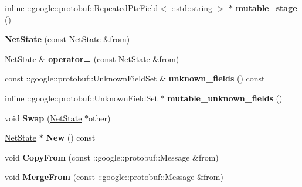 \begin{DoxyCompactItemize}
inline \+::google\+::protobuf\+::\+Repeated\+Ptr\+Field$<$ \+::std\+::string $>$ $\ast$ {\bfseries mutable\+\_\+stage} ()
\item 
\mbox{\label{classcaffe_1_1_net_state_a4ed6fc10204f8b465358ea3d5d91e056}} 
{\bfseries Net\+State} (const \mbox{\hyperlink{classcaffe_1_1_net_state}{Net\+State}} \&from)
\item 
\mbox{\label{classcaffe_1_1_net_state_a71a4d8067a0e605e09ad5cfa65eea531}} 
\mbox{\hyperlink{classcaffe_1_1_net_state}{Net\+State}} \& {\bfseries operator=} (const \mbox{\hyperlink{classcaffe_1_1_net_state}{Net\+State}} \&from)
\item 
\mbox{\label{classcaffe_1_1_net_state_afd37393add738cbfd7c992efcdc9ea62}} 
const \+::google\+::protobuf\+::\+Unknown\+Field\+Set \& {\bfseries unknown\+\_\+fields} () const
\item 
\mbox{\label{classcaffe_1_1_net_state_a6de6e474fe7bf5316b4c853ffcc763d7}} 
inline \+::google\+::protobuf\+::\+Unknown\+Field\+Set $\ast$ {\bfseries mutable\+\_\+unknown\+\_\+fields} ()
\item 
\mbox{\label{classcaffe_1_1_net_state_aa61f61f1042e9e19cb4dc01239539ed8}} 
void {\bfseries Swap} (\mbox{\hyperlink{classcaffe_1_1_net_state}{Net\+State}} $\ast$other)
\item 
\mbox{\label{classcaffe_1_1_net_state_a7054d37ee3012f1e378ef2b748e67053}} 
\mbox{\hyperlink{classcaffe_1_1_net_state}{Net\+State}} $\ast$ {\bfseries New} () const
\item 
\mbox{\label{classcaffe_1_1_net_state_a428b826cdd4815d84b8816ffce06eb4f}} 
void {\bfseries Copy\+From} (const \+::google\+::protobuf\+::\+Message \&from)
\item 
\mbox{\label{classcaffe_1_1_net_state_afcdb44a71c6613176235da98fc0bf72b}} 
void {\bfseries Merge\+From} (const \+::google\+::protobuf\+::\+Message \&from)
\item 
\mbox{\label{classcaffe_1_1_net_state_a8d9e54f93e634f897335685226e41d4e}} 

\end{DoxyCompactItemize}

